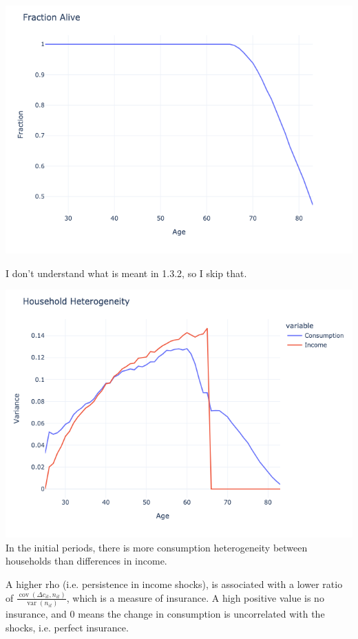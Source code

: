 \begin{questions}
\begin{solution}
\includegraphics[scale=0.5]{figures/fraction_alive.png}

I don't understand what is meant in 1.3.2, so I skip that.

\includegraphics[scale=0.5]{figures/hh_heterogeneity.png}
In the initial periods, there is more consumption heterogeneity between households than differences in income. 

\end{solution}

\begin{solution}
A higher rho (i.e. persistence in income shocks), is associated with a lower ratio of $\frac{\operatorname{cov}\left(\Delta c_{i t}, n_{i t}\right)}{\operatorname{var}\left(n_{i t}\right)}$, which is a measure of insurance. A high positive value is no insurance, and 0 means the change in consumption is uncorrelated with the shocks, i.e. perfect insurance. 


\end{solution}
\end{questions}
